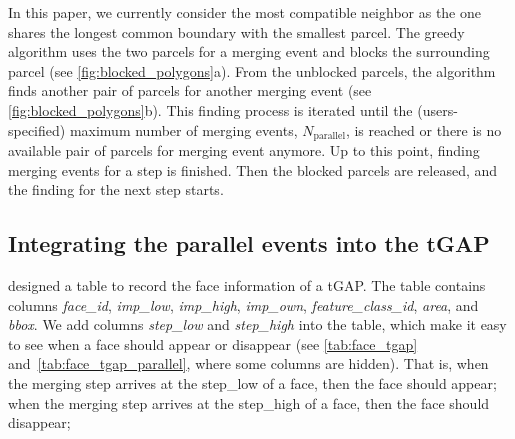 \documentclass[ijgi,article,submit,moreauthors,pdftex]{Definitions/mdpi}
\begin{document}
In this paper, we currently consider the most compatible neighbor
as the one shares the longest common boundary with the smallest parcel.
The greedy algorithm uses the two parcels for a merging event
and blocks the surrounding parcel (see \fig\ref{fig:blocked_polygons}a).
From the unblocked parcels, the algorithm finds another pair of parcels
for another merging event
(see \fig\ref{fig:blocked_polygons}b).
This finding process is iterated 
until the (users-specified) maximum number of merging events, 
$N_\mathrm{parallel}$, is reached or 
there is no available pair of parcels for merging event anymore.
Up to this point, finding merging events for a step is finished.
Then the blocked parcels are released, 
and the finding for the next step starts.



%
%

\subsection{Integrating the parallel events into the tGAP}

\citet[\fig5.9b]{Meijers2011Thesis} designed a table 
to record the face information of a tGAP.
The table contains columns \emph{face\_id}, 
\emph{imp\_low}, \emph{imp\_high}, \emph{imp\_own},
\emph{feature\_class\_id}, \emph{area}, and \emph{bbox}.
We add columns \emph{step\_low} and \emph{step\_high} into the table, 
which make it easy to see when a face should appear or disappear 
(see \tbls\ref{tab:face_tgap} and~\ref{tab:face_tgap_parallel},
where some columns are hidden).
That is, when the merging step arrives at the step\_low of a face,
then the face should appear;
when the merging step arrives at the step\_high of a face,
then the face should disappear;
\end{document}

